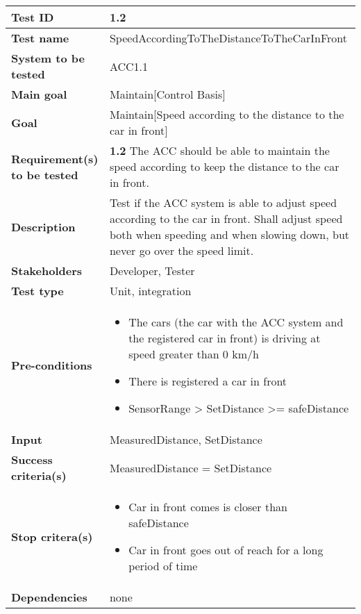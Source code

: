 	\begin{table}[H]
		\begin{tabular}{| p{4cm} | p{10cm} |}
		\hline
		\rowcolor{gray}
			\hline
			{\bf Test ID} & 1.2 \\ \hline
			{\bf Test name} & SpeedAccordingToTheDistanceToTheCarInFront \\ \hline
			{\bf System to be tested} & ACC1.1\\ \hline
			{\bf Main goal} & Maintain[Control Basis] \\ \hline
			{\bf Goal} & Maintain[Speed according to the distance to the car in front] 
			\\ \hline
			{\bf Requirement(s) to be tested} & {\bf 1.2} The ACC should be able to 
			maintain the speed according to keep the distance to the car in front. 
			\\ \hline
			{\bf Description} & Test if the ACC system is able to adjust speed according 
			to the car in front. Shall adjust speed both when speeding and when slowing down, 
			but never go over the speed limit.\\ \hline
			{\bf Stakeholders} & Developer, Tester\\ \hline
			{\bf Test type} &  Unit, integration \\ \hline
			{\bf Pre-conditions} & 
				\begin{itemize}
					\item The cars (the car with the ACC system and the registered car in front) 
					is driving at speed greater than 0 km/h
					\item There is registered a car in front
					\item SensorRange > SetDistance >= safeDistance 
				\end{itemize} \\ \hline
			{\bf Input} & MeasuredDistance, SetDistance\\ \hline
			{\bf Success criteria(s)}& MeasuredDistance = SetDistance\\ \hline
			{\bf Stop critera(s)} &  
				\begin{itemize}
					\item Car in front comes is closer than safeDistance
					\item Car in front goes out of reach for a long period of time
				\end{itemize}\\ \hline
			{\bf Dependencies} & none \\ \hline
		\end{tabular}
	\end{table}

